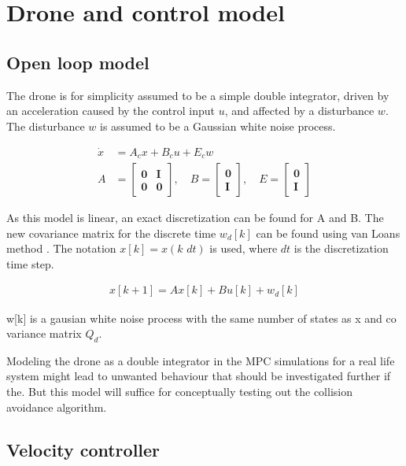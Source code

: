 \section{Drone and control model} \label{Model}

\subsection{Open loop model}

The drone is for simplicity assumed to be a simple double integrator, driven by an acceleration caused by the control input $u$, and affected by a disturbance $w$. The disturbance $w$ is assumed to be a Gaussian white noise process. 

\begin{align}
    \dot{x} & = A_c x + B_c u + E_c w\\
    A & = \begin{bmatrix} \mathbf{0} & \mathbf{I} \\ \mathbf{0} & \mathbf{0} \end{bmatrix}, \quad 
    B  = \begin{bmatrix} \mathbf{0}  \\ \mathbf{I} \end{bmatrix} , \quad 
    E  = \begin{bmatrix} \mathbf{0}  \\ \mathbf{I} \end{bmatrix} 
\end{align}

As this model is linear, an exact discretization can be found for A and B. The new covariance matrix for the discrete time $w_d[k]$ can be found using van Loans method \cite{brown1992introduction}. The notation $x[k] = x(k \, \, dt)$ is used, where $dt$ is the discretization time step. 

\begin{align}
    x[k+1]  = A x[k] + B u[k] + w_d[k]
\end{align}

w[k] is a gausian white noise process with the same number of states as x and co variance matrix $Q_d$.

Modeling the drone as a double integrator in the MPC simulations for a real life system might lead to unwanted behaviour that should be investigated further if the. But this model will suffice for conceptually testing out the collision avoidance algorithm. 

\subsection{Velocity controller}

